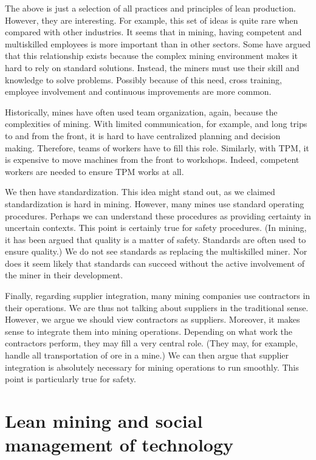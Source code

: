 \documentclass[
  12pt,
]{scrbook}
\begin{document}
The above is just a selection of all practices and principles of lean production. However, they are interesting. For example, this set of ideas is quite rare when compared with other industries. It seems that in mining, having competent and multiskilled employees is more important than in other sectors. Some have argued that this relationship exists because the complex mining environment makes it hard to rely on standard solutions. Instead, the miners must use their skill and knowledge to solve problems. Possibly because of this need, cross training, employee involvement and continuous improvements are more common.

Historically, mines have often used team organization, again, because the complexities of mining. With limited communication, for example, and long trips to and from the front, it is hard to have centralized planning and decision making. Therefore, teams of workers have to fill this role. Similarly, with TPM, it is expensive to move machines from the front to workshops. Indeed, competent workers are needed to ensure TPM works at all.

We then have standardization. This idea might stand out, as we claimed standardization is hard in mining. However, many mines use standard operating procedures. Perhaps we can understand these procedures as providing certainty in uncertain contexts. This point is certainly true for safety procedures. (In mining, it has been argued that quality is a matter of safety. Standards are often used to ensure quality.) We do not see standards as replacing the multiskilled miner. Nor does it seem likely that standards can succeed without the active involvement of the miner in their development.

Finally, regarding supplier integration, many mining companies use contractors in their operations. We are thus not talking about suppliers in the traditional sense. However, we argue we should view contractors as suppliers. Moreover, it makes sense to integrate them into mining operations. Depending on what work the contractors perform, they may fill a very central role. (They may, for example, handle all transportation of ore in a mine.) We can then argue that supplier integration is absolutely necessary for mining operations to run smoothly. This point is particularly true for safety.

\hypertarget{lean-mining-and-social-management-of-technology}{%
\section*{Lean mining and social management of technology}\label{lean-mining-and-social-management-of-technology}}
\end{document}
